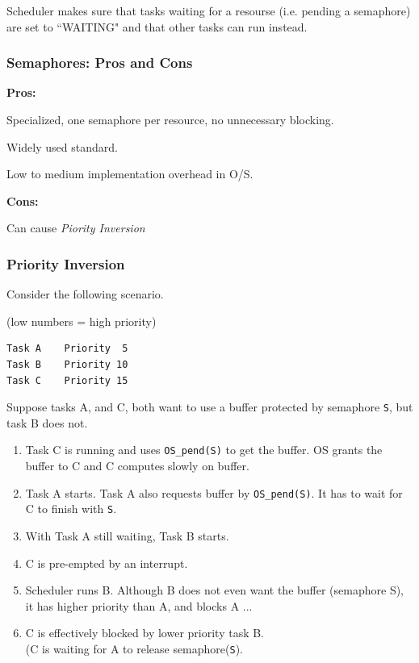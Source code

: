 Scheduler makes sure that tasks waiting for a resourse (i.e. pending a semaphore)
are set to ``WAITING" and that other tasks can run instead.





\subsubsection*{Semaphores: Pros and Cons}
{\bf Pros:}

Specialized, one semaphore per resource, no
unnecessary blocking.

Widely used standard.

Low to medium implementation overhead in O/S.

{\bf Cons:}

Can cause {\it Piority Inversion}




\subsubsection{Priority Inversion}

Consider the following scenario.

(low numbers = high priority)
\begin{verbatim}
Task A    Priority  5
Task B    Priority 10
Task C    Priority 15
\end{verbatim}

Suppose tasks A, and C, both  want to use a buffer protected by semaphore {\tt S},
but task B does not.
%
\begin{enumerate}
        \item Task C is running and uses {\tt OS\_pend(S)} to
        get the buffer.  OS grants the buffer to C and C computes
         slowly on buffer.
        \item Task A starts.  Task A also requests buffer by {\tt OS\_pend(S)}.
          It has to wait for C to finish with {\tt S}.
        \item With Task A still waiting, Task B starts.
        \item C is pre-empted by an interrupt.
        \item Scheduler runs B.  Although B does not even want the
        buffer (semaphore S),   it has higher
        priority than A,  and blocks A ...
        
        \item C is effectively blocked by lower priority task B. \\
        (C is waiting for A to release semaphore({\tt S}).
\end{enumerate}


